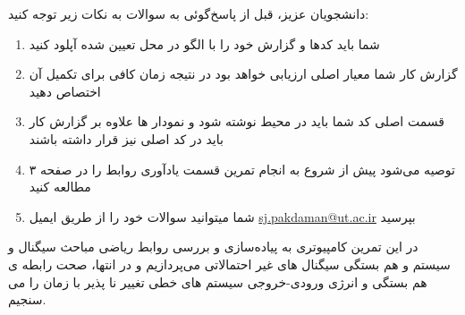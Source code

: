 \documentclass[14pt, professionalfont]{article}
\begin{document}
{ \Large
	
	دانشجویان عزیز، قبل از پاسخ‌گوئی به سوالات به نکات زیر توجه کنید:
	\begin{enumerate}
	\item 
	شما باید کدها و گزارش خود را با الگو
	\:
	\:
	در محل تعیین شده آپلود کنید
	\item 
	گزارش کار شما معیار اصلی ارزیابی خواهد بود در نتیجه زمان کافی	 برای تکمیل آن اختصاص دهید
	\item 
	
	قسمت اصلی کد شما باید در محیط 
	\:
	\:
	نوشته شود و نمودار ها علاوه‌ بر گزارش کار باید در کد اصلی نیز قرار داشته باشند
	\item
	توصیه می‌شود پیش‌ از شروع به انجام تمرین قسمت یادآوری روابط را در صفحه ۳ مطالعه کنید
	\item 
	شما میتوانید سوالات خود را از طریق ایمیل
	\textcolor{blue}{
		\: 
		\href{mailto:sj.pakdaman@ut.ac.ir}{sj.pakdaman@ut.ac.ir}
		\:}
	بپرسید
	\end{enumerate}
}
	
	\thispagestyle{empty}
	\clearpage
	\pagebreak
	
	در این تمرین کامپیوتری به پیاده‌سازی  و بررسی روابط ریاضی مباحث 
	\:
	سیگنال و سیستم 
	\:
	و هم بستگی سیگنال های غیر احتمالاتی می‌پردازیم و در انتها، صحت رابطه ی هم بستگی و انرژی ورودی-خروجی سیستم های خطی تغییر نا پذیر با زمان را می سنجیم.
	
\end{document}
